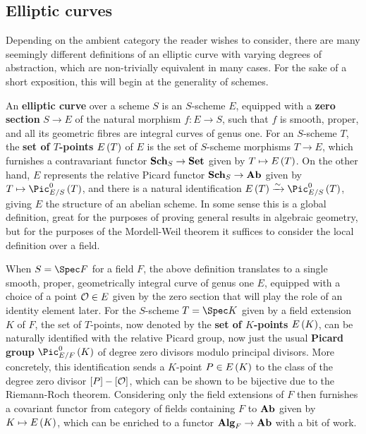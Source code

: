 \subsection{Elliptic curves}

Depending on the ambient category the reader wishes to consider, there are many seemingly different definitions of an elliptic curve with varying degrees of abstraction, which are non-trivially equivalent in many cases. For the sake of a short exposition, this will begin at the generality of schemes.

An \textbf{elliptic curve} over a scheme $ S $ is an $ S $-scheme $ E $, equipped with a \textbf{zero section} $ S \to E $ of the natural morphism $ f : E \to S $, such that $ f $ is smooth, proper, and all its geometric fibres are integral curves of genus one. For an $ S $-scheme $ T $, the \textbf{set of $ T $-points} $ E\br{T} $ of $ E $ is the set of $ S $-scheme morphisms $ T \to E $, which furnishes a contravariant functor $ \textbf{Sch}_S \to \textbf{Set} $ given by $ T \mapsto E\br{T} $. On the other hand, $ E $ represents the relative Picard functor $ \textbf{Sch}_S \to \textbf{Ab} $ given by $ T \mapsto \Pic_{E / S}^0\br{T} $, and there is a natural identification $ E\br{T} \xrightarrow{\sim} \Pic_{E / S}^0\br{T} $, giving $ E $ the structure of an abelian scheme. In some sense this is a global definition, great for the purposes of proving general results in algebraic geometry, but for the purposes of the Mordell-Weil theorem it suffices to consider the local definition over a field.

When $ S = \Spec F $ for a field $ F $, the above definition translates to a single smooth, proper, geometrically integral curve of genus one $ E $, equipped with a choice of a point $ \mathcal{O} \in E $ given by the zero section that will play the role of an identity element later. For the $ S $-scheme $ T = \Spec K $ given by a field extension $ K $ of $ F $, the set of $ T $-points, now denoted by the \textbf{set of $ K $-points} $ E\br{K} $, can be naturally identified with the relative Picard group, now just the usual \textbf{Picard group} $ \Pic_{E / F}^0\br{K} $ of degree zero divisors modulo principal divisors. More concretely, this identification sends a $ K $-point $ P \in E\br{K} $ to the class of the degree zero divisor $ \sbr{P} - \sbr{\OOO} $, which can be shown to be bijective due to the Riemann-Roch theorem. Considering only the field extensions of $ F $ then furnishes a covariant functor from category of fields containing $ F $ to $ \textbf{Ab} $ given by $ K \mapsto E\br{K} $, which can be enriched to a functor $ \textbf{Alg}_F \to \textbf{Ab} $ with a bit of work.


